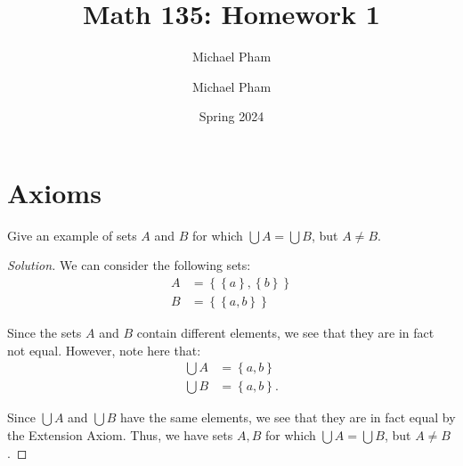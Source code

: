 \documentclass{article}
\title{#1}
\author{Michael Pham}
\date{#2}
\newenvironment{solution}{\begin{proof}[Solution]}{\end{proof}}
\newcommand{\brc}[1]{ \left\{  {#1} \right\}}
\newcommand{\mytitle}[2]{%
	\title{#1}
	\author{Michael Pham}
	\date{#2}
	\maketitle
	\newpage
	\tableofcontents
	\newpage
}
\begin{document}
	\mytitle{Math 135: Homework 1}{Spring 2024}
	
	\section{Axioms}
	\begin{hw}[Problem 2.2]
		Give an example of sets $A$ and $B$ for which $\bigcup A = \bigcup B$, but $A \neq B$.
	\end{hw}
	\begin{solution}
		We can consider the following sets:
		\begin{align*}
			A &= \brc{ \brc{a}, \brc{b}} \\
			B &= \brc{ \brc{a, b}}
		\end{align*}
	
		Since the sets $A$ and $B$ contain different elements, we see that they are in fact not equal. However, note here that:
		\begin{align*}
			\bigcup A &= \brc{a,b} \\
			\bigcup B &= \brc{a,b}.
		\end{align*}
	
		Since $\bigcup A$ and $\bigcup B$ have the same elements, we see that they are in fact equal by the Extension Axiom. Thus, we have sets $A,B$ for which $\bigcup A = \bigcup B$, but $A \neq B$.
	\end{solution}
\end{document}
